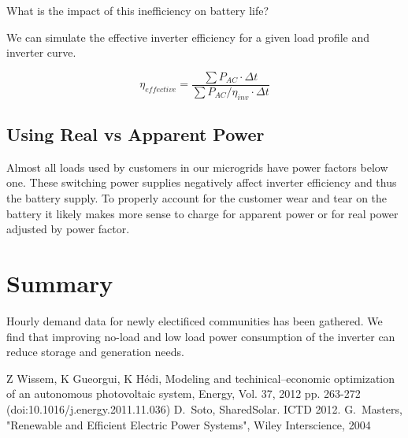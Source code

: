 \documentclass[conference]{IEEEtran}
\begin{document}
What is the impact of this inefficiency on battery life?

We can simulate the effective inverter efficiency for a given
load profile and inverter curve.

$$ \eta_{effective} = \frac{\sum P_{AC} \cdot \Delta t}
                          {\sum P_{AC} /\eta_{inv} \cdot \Delta t} $$




\subsection{Using Real vs Apparent Power}
Almost all loads used by customers in our microgrids have power
factors below one.
These switching power supplies negatively affect inverter efficiency
and thus the battery supply.
To properly account for the customer wear and tear on the battery
it likely makes more sense to charge for apparent power or for
real power adjusted by power factor.







\section{Summary}
Hourly demand data for newly electificed communities has been gathered.
We find that improving no-load and low load power consumption of the
inverter can reduce storage and generation needs.

\begin{thebibliography}{1}
Z Wissem, K Gueorgui, K H\'edi,
Modeling and techinical--economic optimization of an autonomous
photovoltaic system,
Energy, Vol. 37, 2012 pp. 263-272
(doi:10.1016/j.energy.2011.11.036)
D.~Soto, SharedSolar. ICTD 2012.
G.~Masters,
"Renewable and Efficient Electric Power Systems",
Wiley Interscience,
2004
\end{thebibliography}
\end{document}

